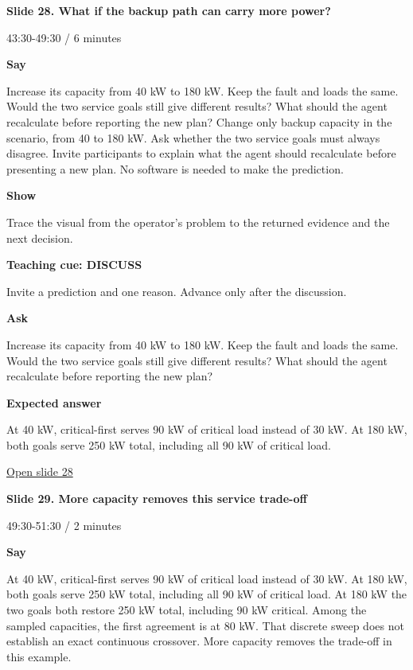 \documentclass[12pt,letterpaper]{article}
\begin{document}
\clearpage{}
{\Large\bfseries\color{IEEEBlue} Slide 28. What if the backup path can carry more power?\par}\medskip
{\small\color{Slate} 43:30-49:30 /\allowbreak{} 6 minutes\par}\medskip
\textbf{Say}\par Increase its capacity from 40 kW to 180 kW. Keep the fault and loads the same. Would the two service goals still give different results? What should the agent recalculate before reporting the new plan? Change only backup capacity in the scenario, from 40 to 180 kW. Ask whether the two service goals must always disagree. Invite participants to explain what the agent should recalculate before presenting a new plan. No software is needed to make the prediction.\par\medskip
\textbf{Show}\par Trace the visual from the operator's problem to the returned evidence and the next decision.\par\medskip
\textbf{Teaching cue: DISCUSS}\par Invite a prediction and one reason. Advance only after the discussion.\par\medskip
\textbf{Ask}\par Increase its capacity from 40 kW to 180 kW. Keep the fault and loads the same. Would the two service goals still give different results? What should the agent recalculate before reporting the new plan?\par\textbf{Expected answer}\par At 40 kW, critical-first serves 90 kW of critical load instead of 30 kW. At 180 kW, both goals serve 250 kW total, including all 90 kW of critical load.\par\medskip
\vfill\href{https://alaaselim-sudo.github.io/GridGuard-Agentic-AI-Tutorials/operator-cases/#/28}{Open slide 28}\par
\clearpage{}
{\Large\bfseries\color{IEEEBlue} Slide 29. More capacity removes this service trade-off\par}\medskip
{\small\color{Slate} 49:30-51:30 /\allowbreak{} 2 minutes\par}\medskip
\textbf{Say}\par At 40 kW, critical-first serves 90 kW of critical load instead of 30 kW. At 180 kW, both goals serve 250 kW total, including all 90 kW of critical load. At 180 kW the two goals both restore 250 kW total, including 90 kW critical. Among the sampled capacities, the first agreement is at 80 kW. That discrete sweep does not establish an exact continuous crossover. More capacity removes the trade-off in this example.\par\medskip
\end{document}

